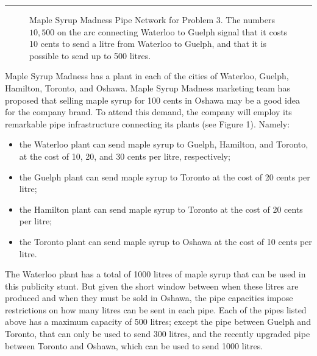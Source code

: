 \documentclass[11pt]{article}
\newcounter{problem}
\newenvironment{problem}{%
    \refstepcounter{problem}%
    \Needspace{7\baselineskip}%
    \par\vspace{0.7em}%
    \noindent\textcolor{courseblue}{\rule{\textwidth}{0.4pt}}%
    \par\vspace{0.5em}%
    \begin{list}{}{%
        \setlength{\leftmargin}{2.3em}%
        \setlength{\labelwidth}{1.8em}%
        \setlength{\labelsep}{0.5em}%
        \setlength{\topsep}{0pt}%
        \setlength{\partopsep}{0pt}%
    }%
    \item[{[\theproblem]}]
}{%
    \end{list}
    \par\vspace{0.5em}
}
\begin{document}
\begin{problem}
    \begin{figure}[h]
    \centering
    \caption{Maple Syrup Madness Pipe Network for Problem 3. The numbers $10,500$ on the arc connecting Waterloo to Guelph signal that it costs 10 cents to send a litre from Waterloo to Guelph, and that it is possible to send up to 500 litres.}
    \end{figure}

    Maple Syrup Madness has a plant in each of the cities of Waterloo, Guelph, Hamilton, Toronto, and Oshawa. Maple Syrup Madness marketing team has proposed that selling maple syrup for 100 cents in Oshawa may be a good idea for the company brand. To attend this demand, the company will employ its remarkable pipe infrastructure connecting its plants (see Figure 1). Namely:

    \begin{itemize}
        \item the Waterloo plant can send maple syrup to Guelph, Hamilton, and Toronto, at the
        cost of 10, 20, and 30 cents per litre, respectively;
        \item the Guelph plant can send maple syrup to Toronto at the cost of 20 cents per litre;
        \item the Hamilton plant can send maple syrup to Toronto at the cost of 20 cents per litre;
        \item the Toronto plant can send maple syrup to Oshawa at the cost of 10 cents per litre.
    \end{itemize}

    The Waterloo plant has a total of 1000 litres of maple syrup that can be used in this publicity stunt. But given the short window between when these litres are produced and when they must be sold in Oshawa, the pipe capacities impose restrictions on how many litres can be sent in each pipe. Each of the pipes listed above has a maximum capacity of 500 litres; except the pipe between Guelph and Toronto, that can only be used to send 300 litres, and the recently upgraded pipe between Toronto and Oshawa, which can be used to send 1000 litres.


\end{problem}
\end{document}
